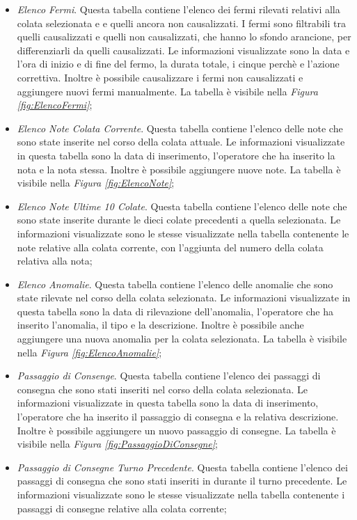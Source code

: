 \begin{itemize}
    \item \textit{Elenco Fermi}. Questa tabella contiene l'elenco dei fermi rilevati relativi alla colata selezionata e 
    e quelli ancora non causalizzati. I fermi sono filtrabili tra quelli causalizzati e quelli non causalizzati,
    che hanno lo sfondo arancione, per differenziarli da quelli causalizzati. Le informazioni visualizzate sono la data e
    l'ora di inizio e di fine del fermo, la durata totale, i cinque perchè e
    l'azione correttiva. Inoltre è possibile causalizzare i fermi non causalizzati e aggiungere nuovi fermi manualmente.
    La tabella è visibile nella \textit{Figura \ref{fig:ElencoFermi}};

    \item \textit{Elenco Note Colata Corrente}. Questa tabella contiene l'elenco delle note che sono state inserite nel corso
    della colata attuale. Le informazioni visualizzate in questa tabella sono la data di inserimento, l'operatore che ha inserito
    la nota e la nota stessa. Inoltre è possibile aggiungere nuove note. La tabella è visibile nella
    \textit{Figura \ref{fig:ElencoNote}};

    \item \textit{Elenco Note Ultime 10 Colate}. Questa tabella contiene l'elenco delle note che sono state inserite durante le
    dieci colate precedenti a quella selezionata. Le informazioni visualizzate sono le stesse visualizzate nella tabella
    contenente le note relative alla colata corrente, con l'aggiunta del numero della colata relativa alla nota;


    \item \textit{Elenco Anomalie}. Questa tabella contiene l'elenco delle anomalie che sono state rilevate nel corso della
    colata selezionata. Le informazioni visualizzate in questa tabella sono la data di rilevazione dell'anomalia,
    l'operatore che ha inserito l'anomalia, il tipo e la descrizione.
    Inoltre è possibile anche aggiungere una nuova anomalia per la colata selezionata.
    La tabella è visibile nella \textit{Figura \ref{fig:ElencoAnomalie}};

    \item \textit{Passaggio di Consenge}. Questa tabella contiene l'elenco dei passaggi di consegna che sono stati inseriti
    nel corso della colata selezionata. Le informazioni visualizzate in questa tabella sono la data di inserimento, l'operatore
    che ha inserito il passaggio di consegna e la relativa descrizione. Inoltre è possibile aggiungere un nuovo passaggio
    di consegne. La tabella è visibile nella \textit{Figura \ref{fig:PassaggioDiConsegne}};

    \item \textit{Passaggio di Consegne Turno Precedente}. Questa tabella contiene l'elenco dei passaggi di consegna che sono
    stati inseriti in durante il turno precedente. Le informazioni visualizzate sono le stesse visualizzate nella tabella
    contenente i passaggi di consegne relative alla colata corrente;

  \end{itemize}

